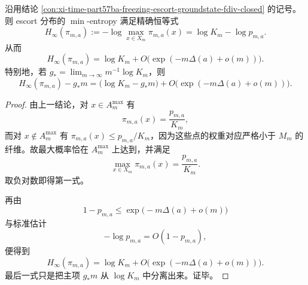 \begin{conclusion}\label{con:xi-time-part57ba-freezing-minentropy-finite-size}
沿用结论 \ref{con:xi-time-part57ba-freezing-escort-groundstate-fdiv-closed} 的记号。则 escort 分布的 \(\min\)-entropy 满足精确恒等式
\[
\boxed{\;
H_\infty(\pi_{m,a})
:=
-\log\max_{x\in X_m}\pi_{m,a}(x)
=
\log K_m-\log p_{m,a}.\;}
\]
从而
\[
\boxed{\;
H_\infty(\pi_{m,a})
=
\log K_m
+O\!\bigl(\exp(-m\Delta(a)+o(m))\bigr).\;}
\]
特别地，若 \(g_*=\lim_{m\to\infty}m^{-1}\log K_m\)，则
\[
\boxed{\;
H_\infty(\pi_{m,a})-g_*m
=
\bigl(\log K_m-g_*m\bigr)
+O\!\bigl(\exp(-m\Delta(a)+o(m))\bigr).\;}
\]
\end{conclusion}
\begin{proof}
由上一结论，对 \(x\in A_m^{\max}\) 有
\[
\pi_{m,a}(x)=\frac{p_{m,a}}{K_m},
\]
而对 \(x\notin A_m^{\max}\) 有 \(\pi_{m,a}(x)\le p_{m,a}/K_m\)，因为这些点的权重对应严格小于 \(M_m\) 的纤维。故最大概率恰在 \(A_m^{\max}\) 上达到，并满足
\[
\max_{x\in X_m}\pi_{m,a}(x)=\frac{p_{m,a}}{K_m}.
\]
取负对数即得第一式。

再由
\[
1-p_{m,a}\le \exp\!\bigl(-m\Delta(a)+o(m)\bigr)
\]
与标准估计
\[
-\log p_{m,a}=O(1-p_{m,a}),
\]
便得到
\[
H_\infty(\pi_{m,a})
=
\log K_m+O\!\bigl(\exp(-m\Delta(a)+o(m))\bigr).
\]
最后一式只是把主项 \(g_*m\) 从 \(\log K_m\) 中分离出来。证毕。
\end{proof}

